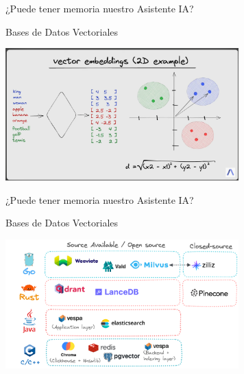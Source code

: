 \documentclass[table, unknownkeysallowed, 10pt]{beamer}
\begin{document}
\begin{frame}{¿Puede tener memoria nuestro Asistente IA?}
    \begin{block}{Bases de Datos Vectoriales}
    \begin{center}
        \includegraphics[width=9cm]{imagenes/vectorDB_graph.png}
    \end{center}
\end{block}
\end{frame}

\begin{frame}{¿Puede tener memoria nuestro Asistente IA?}

    \begin{block}{Bases de Datos Vectoriales}
    \begin{center}
        \includegraphics[width=9cm]{imagenes/tiposVectorDB.png}
    \end{center}
\end{block}
\end{frame}
\end{document}
